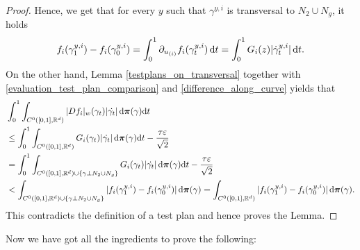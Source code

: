 \documentclass[a4paper,10pt]{article}
\numberwithin{equation}{section}
\newcommand{\R}{\mathbb{R}}
\newcommand{\e}{\varepsilon}
\newcommand{\di}{{\rm d}}
\begin{document}
\begin{proof}
Hence, we get that for every $y$ such that $\gamma^{y,i}$ is transversal to $N_2 \cup N_g$, it holds
\begin{align}\label{difference_along_curve}
     f_i(\gamma^{y,i}_1)-  f_i(\gamma^{y,i}_0) = \int_0^1  \partial_{u_{(i)}}f_i(\gamma^{y,i}_t) \,\di t = \int_0^1 G_i(z)|\dot{\gamma}_t^{y,i}|\,\di t.
\end{align}
On the other hand, Lemma \ref{testplans_on_transversal} together with \eqref{evaluation_test_plan_comparison} and \eqref{difference_along_curve} yields that 
\begin{align*}
 &\int_0^1 \int_{C^0([0,1], \R^d)} |Df_i|_w(\gamma_t)|\dot{\gamma_t}|\,\di \boldsymbol{\pi}(\gamma) \di t \\
    &\leq \int_0^1 \int_{C^0([0,1], \R^d)} G_i(\gamma_t)|\dot{\gamma_t}|\,\di \boldsymbol{\pi}(\gamma) \di t-\frac{\tau\e}{\sqrt{2}} \\
    &= \int_0^1 \int_{C^0([0,1], \R^d)\cup \{\gamma \perp N_2\cup N_g\}} G_i(\gamma_t)|\dot{\gamma_t}|\,\di \boldsymbol{\pi}(\gamma) \di t-\frac{\tau\e}{\sqrt{2}}\\
    &< \int_{C^0([0,1], \R^d)\cup \{\gamma \perp N_2\cup N_g\}}| f_i(\gamma_1^{y,i})-f_i(\gamma_0^{y,i})|\, \di \boldsymbol{\pi}(\gamma) = \int_{C^0([0,1], \R^d)}| f_i(\gamma_1^{y,i})-f_i(\gamma_0^{y,i})|\, \di \boldsymbol{\pi}(\gamma).
\end{align*}
This contradicts the definition of a test plan and hence proves the Lemma. 
\end{proof}
Now we have got all the ingredients to prove the following: 
\smallskip
\end{document}
